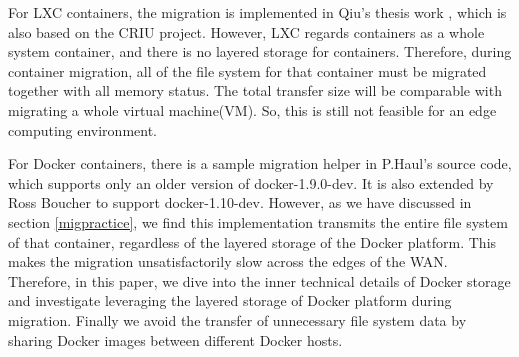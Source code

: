 For LXC containers, the migration is implemented in Qiu's thesis work \cite{qiu2016evaluating}, which is also based on the CRIU project. However, LXC regards containers as a whole system container, and there is no layered storage for containers. Therefore, during container migration, all of the file system for that container must be migrated together with all memory status. The total transfer size will be comparable with migrating a whole virtual machine(VM). So, this is still not feasible for an edge computing environment. 

For Docker containers, there is a sample migration helper in P.Haul's source code, which supports only an older version of docker-1.9.0-dev. It is also extended by Ross Boucher to support docker-1.10-dev. However, as we have discussed in section \ref{migpractice}, we find this implementation transmits the entire file system of that container, regardless of the layered storage of the Docker platform. This makes the migration unsatisfactorily slow across the edges of the WAN. Therefore, in this paper, we dive into the inner technical details of Docker storage and investigate leveraging the layered storage of Docker platform during migration. Finally we avoid the transfer of unnecessary file system data by sharing Docker images between different Docker hosts. 


